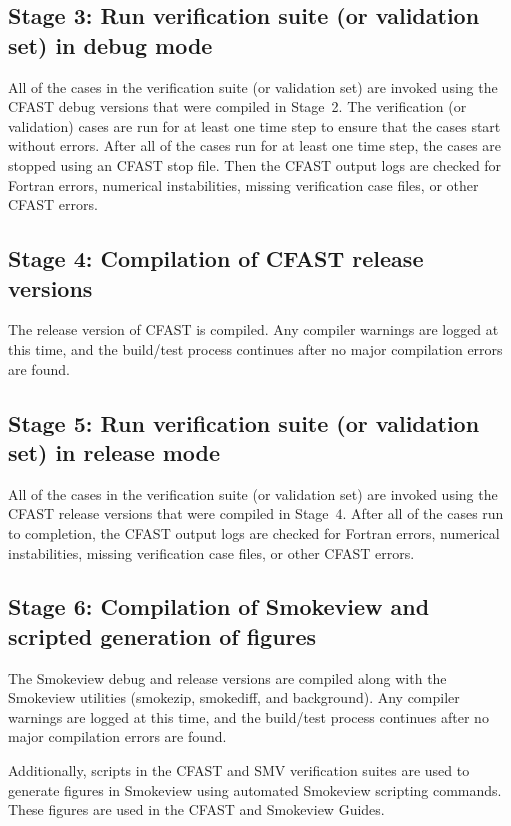 \documentclass[12pt]{book}
\begin{document}
\subsection*{Stage 3: Run verification suite (or validation set) in debug mode}

All of the cases in the verification suite (or validation set) are invoked using the CFAST debug versions that were compiled in Stage~2. The verification (or validation) cases are run for at least one time step to ensure that the cases start without errors. After all of the cases run for at least one time step, the cases are stopped using an CFAST stop file. Then the CFAST output logs are checked for Fortran errors, numerical instabilities, missing verification case files, or other CFAST errors.

\subsection*{Stage 4: Compilation of CFAST release versions}

The release version of CFAST is compiled. Any compiler warnings are logged at this time, and the build/test process continues after no major compilation errors are found.

\subsection*{Stage 5: Run verification suite (or validation set) in release mode}

All of the cases in the verification suite (or validation set) are invoked using the CFAST release versions that were compiled in Stage~4. After all of the cases run to completion, the CFAST output logs are checked for Fortran errors, numerical instabilities, missing verification case files, or other CFAST errors.

\subsection*{Stage 6: Compilation of Smokeview and scripted generation of figures}

The Smokeview debug and release versions are compiled along with the Smokeview utilities (smokezip, smokediff, and background). Any compiler warnings are logged at this time, and the build/test process continues after no major compilation errors are found.

Additionally, scripts in the CFAST and SMV verification suites are used to generate figures in Smokeview using automated Smokeview scripting commands. These figures are used in the CFAST and Smokeview Guides.
\end{document}
